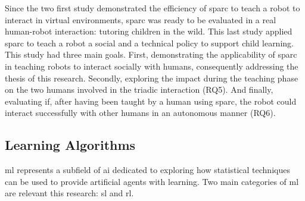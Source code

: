 Since the two first study demonstrated the efficiency of \gls{sparc} to teach a robot to interact in virtual environments, \gls{sparc} was ready to be evaluated in a real human-robot interaction: tutoring children in the wild. This last study applied \gls{sparc} to teach a robot a social and a technical policy to support child learning. This study had three main goals. First, demonstrating the applicability of \gls{sparc} in teaching robots to interact socially with humans, consequently addressing the thesis of this research. Secondly, exploring the impact during the teaching phase on the two humans involved in the triadic interaction (RQ5). And finally, evaluating if, after having been taught by a human using \gls{sparc}, the robot could interact successfully with other humans in an autonomous manner (RQ6).

%
%
%
%
%

\subsection{Learning Algorithms}

\gls{ml} represents a subfield of \gls{ai} dedicated to exploring how statistical techniques can be used to provide artificial agents with learning. Two main categories of \gls{ml} are relevant this research: \gls{sl} and \gls{rl}.

